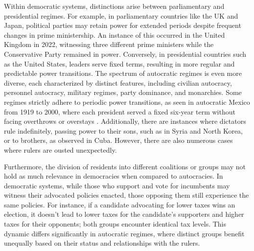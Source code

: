 \documentclass[
  12pt,
  a4paper,
  12pt]{article}
\begin{document}
Within democratic systems, distinctions arise between parliamentary and
presidential regimes. For example, in parliamentary countries like the
UK and Japan, political parties may retain power for extended periods
despite frequent changes in prime ministership. An instance of this
occurred in the United Kingdom in 2022, witnessing three different prime
ministers while the Conservative Party remained in power. Conversely, in
presidential countries such as the United States, leaders serve fixed
terms, resulting in more regular and predictable power transitions. The
spectrum of autocratic regimes is even more diverse, each characterized
by distinct features, including civilian autocracy, personnel autocracy,
military regimes, party dominance, and monarchies. Some regimes strictly
adhere to periodic power transitions, as seen in autocratic Mexico from
1919 to 2000, where each president served a fixed six-year term without
facing overthrows or overstays \citep[perfe2021]{a}. Additionally, there
are instances where dictators rule indefinitely, passing power to their
sons, such as in Syria and North Korea, or to brothers, as observed in
Cuba. However, there are also numerous cases where rulers are ousted
unexpectedly.

Furthermore, the division of residents into different coalitions or
groups may not hold as much relevance in democracies when compared to
autocracies. In democratic systems, while those who support and vote for
incumbents may witness their advocated policies enacted, those opposing
them still experience the same policies. For instance, if a candidate
advocating for lower taxes wins an election, it doesn't lead to lower
taxes for the candidate's supporters and higher taxes for their
opponents; both groups encounter identical tax levels. This dynamic
differs significantly in autocratic regimes, where distinct groups
benefit unequally based on their status and relationships with the
rulers.
\end{document}
